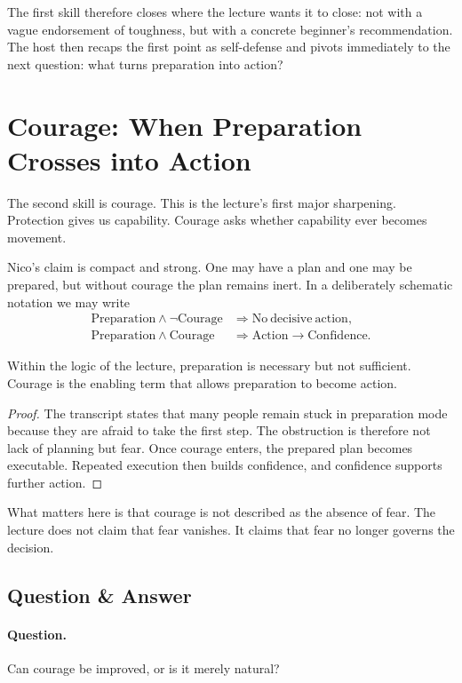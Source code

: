 The first skill therefore closes where the lecture wants it to close: not with a vague endorsement of toughness, but with a concrete beginner's recommendation. The host then recaps the first point as self-defense and pivots immediately to the next question: what turns preparation into action?

\section{Courage: When Preparation Crosses into Action}

The second skill is courage. This is the lecture's first major sharpening. Protection gives us capability. Courage asks whether capability ever becomes movement.

Nico's claim is compact and strong. One may have a plan and one may be prepared, but without courage the plan remains inert. In a deliberately schematic notation we may write
\begin{align}
\mathrm{Preparation}\land \neg \mathrm{Courage}
&\Rightarrow
\mathrm{No\ decisive\ action},\\
\mathrm{Preparation}\land \mathrm{Courage}
&\Rightarrow
\mathrm{Action}\to \mathrm{Confidence}.
\end{align}

\begin{proposition}
Within the logic of the lecture, preparation is necessary but not sufficient. Courage is the enabling term that allows preparation to become action.
\end{proposition}

\begin{proof}
The transcript states that many people remain stuck in preparation mode because they are afraid to take the first step. The obstruction is therefore not lack of planning but fear. Once courage enters, the prepared plan becomes executable. Repeated execution then builds confidence, and confidence supports further action.
\end{proof}

What matters here is that courage is not described as the absence of fear. The lecture does not claim that fear vanishes. It claims that fear no longer governs the decision.

\subsection{Question \& Answer}

\paragraph{Question.} Can courage be improved, or is it merely natural?

